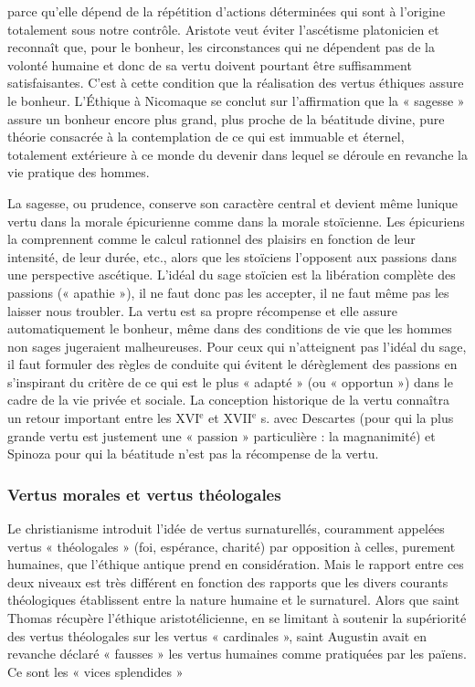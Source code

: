 parce qu’elle dépend de la répétition d’actions
déterminées qui sont à l’origine
totalement sous notre contrôle. Aristote
veut éviter l’ascétisme platonicien et
reconnaît que, pour le bonheur, les circonstances
qui ne dépendent pas de la
volonté humaine et donc de sa vertu doivent
pourtant être suffisamment satisfaisantes.
C’est à cette condition que la
réalisation des vertus éthiques assure le
bonheur. L'Éthique à Nicomaque se
conclut sur l'affirmation que la « sagesse »
assure un bonheur encore plus grand, plus
proche de la béatitude divine, pure théorie
consacrée à la contemplation de ce qui
est immuable et éternel, totalement extérieure
à ce monde du devenir dans lequel
se déroule en revanche la vie pratique des
hommes.

La sagesse, ou prudence, conserve son
caractère central et devient même
lunique vertu dans la morale épicurienne
comme dans la morale stoïcienne. Les
épicuriens la comprennent comme le calcul
rationnel des plaisirs en fonction de
leur intensité, de leur durée, etc., alors
que les stoïciens l’opposent aux passions
dans une perspective ascétique. L'idéal du
sage stoïcien est la libération complète
des passions (« apathie »), il ne faut donc
pas les accepter, il ne faut même pas les
laisser nous troubler. La vertu est sa
propre récompense et elle assure automatiquement
le bonheur, même dans des
conditions de vie que les hommes non
sages jugeraient malheureuses. Pour ceux
qui n’atteignent pas l’idéal du sage, il faut
formuler des règles de conduite qui évitent
le dérèglement des passions en s’inspirant
du critère de ce qui est le plus
« adapté » (ou « opportun ») dans le cadre
de la vie privée et sociale. La conception
historique de la vertu connaîtra un retour
important entre les {\footnotesize XVI}$^\text{e}$ et
{\footnotesize XVII}$^\text{e}$ s. avec
Descartes (pour qui la plus grande vertu
est justement une « passion » particulière :
la magnanimité) et Spinoza pour
qui la béatitude n’est pas la récompense
de la vertu.

\subsubsection{Vertus morales et vertus théologales}


Le christianisme introduit l’idée de vertus
surnaturellés, couramment appelées
vertus « théologales » (foi, espérance,
charité) par opposition à celles, purement
humaines, que l’éthique antique prend en
considération. Mais le rapport entre ces
deux niveaux est très différent en fonction
des rapports que les divers courants théologiques
établissent entre la nature
humaine et le surnaturel. Alors que saint
Thomas récupère l'éthique  aristotélicienne,
en se limitant à soutenir la supériorité
des vertus théologales sur les
vertus « cardinales », saint Augustin avait
en revanche déclaré « fausses » les vertus
humaines comme pratiquées par les
païens. Ce sont les « vices splendides »

